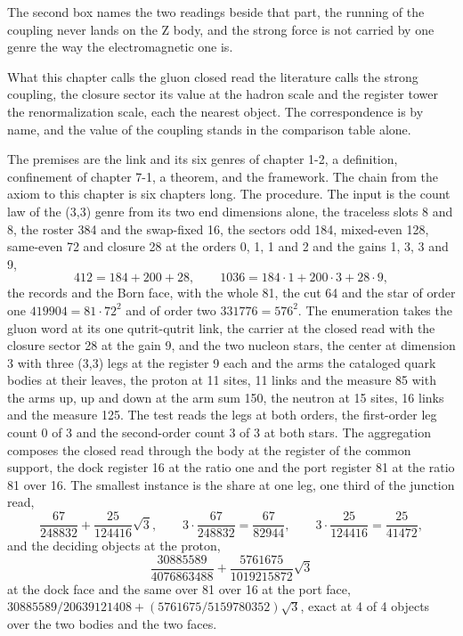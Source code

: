 The second box names the two readings beside that part, the running of the coupling never lands on the Z body, and the strong force is not carried by one genre the way the electromagnetic one is.
\begin{chbridge}
What this chapter calls the gluon closed read the literature calls the strong coupling, the closure sector its value at the hadron scale and the register tower the renormalization scale, each the nearest object. The correspondence is by name, and the value of the coupling stands in the comparison table alone.
\end{chbridge}
\begin{chproof}
The premises are the link and its six genres of chapter 1-2, a definition, confinement of chapter 7-1, a theorem, and the framework. The chain from the axiom to this chapter is six chapters long. The procedure. The input is the count law of the (3,3) genre from its two end dimensions alone, the traceless slots 8 and 8, the roster 384 and the swap-fixed 16, the sectors odd 184, mixed-even 128, same-even 72 and closure 28 at the orders 0, 1, 1 and 2 and the gains 1, 3, 3 and 9,
\begin{equation}
412 = 184 + 200 + 28, \qquad 1036 = 184 \cdot 1 + 200 \cdot 3 + 28 \cdot 9 ,
\end{equation}
the records and the Born face, with the whole 81, the cut 64 and the star of order one $419904 = 81 \cdot 72^{2}$ and of order two $331776 = 576^{2}$. The enumeration takes the gluon word at its one qutrit-qutrit link, the carrier at the closed read with the closure sector 28 at the gain 9, and the two nucleon stars, the center at dimension 3 with three (3,3) legs at the register 9 each and the arms the cataloged quark bodies at their leaves, the proton at 11 sites, 11 links and the measure 85 with the arms up, up and down at the arm sum 150, the neutron at 15 sites, 16 links and the measure 125. The test reads the legs at both orders, the first-order leg count 0 of 3 and the second-order count 3 of 3 at both stars. The aggregation composes the closed read through the body at the register of the common support, the dock register 16 at the ratio one and the port register 81 at the ratio 81 over 16. The smallest instance is the share at one leg, one third of the junction read,
\begin{equation}
\frac{67}{248832} + \frac{25}{124416}\sqrt{3}, \qquad 3 \cdot \frac{67}{248832} = \frac{67}{82944}, \qquad 3 \cdot \frac{25}{124416} = \frac{25}{41472} ,
\end{equation}
and the deciding objects at the proton,
\begin{equation}
\frac{30885589}{4076863488} + \frac{5761675}{1019215872}\sqrt{3}
\end{equation}
at the dock face and the same over 81 over 16 at the port face, $30885589/20639121408 + (5761675/5159780352)\sqrt{3}$, exact at 4 of 4 objects over the two bodies and the two faces.


\end{chproof}
